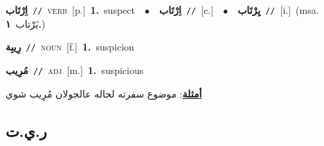 \documentclass[10pt,a4paper,twoside]{article} %
\begin{document}
\begin{multicols}{2}
{\setlength\topsep{0pt}\textbf{\foreignlanguage{arabic}{اِرْتَاب}}\ {\color{gray}\texttt{//}\color{black}}\ \textsc{verb}\ [p.]\ \textbf{1.}~suspect\ \ $\bullet$\ \ \setlength\topsep{0pt}\textbf{\foreignlanguage{arabic}{اِرْتَاب}}\ {\color{gray}\texttt{//}\color{black}}\ [c.]\ \ $\bullet$\ \ \setlength\topsep{0pt}\textbf{\foreignlanguage{arabic}{يِرْتَاب}}\ {\color{gray}\texttt{//}\color{black}}\ [i.]\ \color{gray}(msa. \foreignlanguage{arabic}{يَرْتاب}~\foreignlanguage{arabic}{\textbf{١.}})\color{black}\ } \vspace{2mm}

{\setlength\topsep{0pt}\textbf{\foreignlanguage{arabic}{رِيبِة}}\ {\color{gray}\texttt{//}\color{black}}\ \textsc{noun}\ [f.]\ \textbf{1.}~suspicion\ } \vspace{2mm}

{\setlength\topsep{0pt}\textbf{\foreignlanguage{arabic}{مُرِيب}}\ {\color{gray}\texttt{//}\color{black}}\ \textsc{adj}\ [m.]\ \textbf{1.}~suspicious\  \begin{flushright}\color{gray}\foreignlanguage{arabic}{\textbf{\underline{\foreignlanguage{arabic}{أمثلة}}}: موضوع سفرته لحاله عالجولان مُرِيب شوي}\end{flushright}\color{black}} \vspace{2mm}

\vspace{-3mm}
\subsection*{\color{blue}\foreignlanguage{arabic}{ر.ي.ت}\color{blue}{}} 


\end{multicols}
\end{document}
